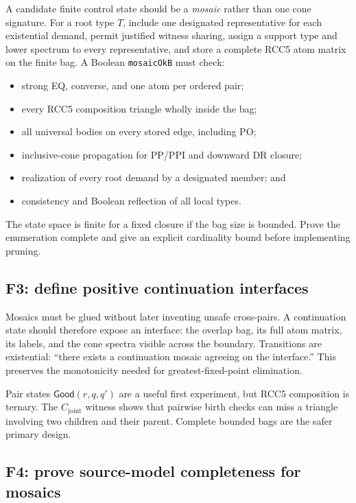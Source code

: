 \documentclass[11pt]{article}
\newcommand{\code}[1]{\texttt{#1}}
\begin{document}
A candidate finite control state should be a \emph{mosaic} rather than one cone
signature. For a root type $T$, include one designated representative for each
existential demand, permit justified witness sharing, assign a support type and lower
spectrum to every representative, and store a complete RCC5 atom matrix on the finite
bag. A Boolean \code{mosaicOkB} must check:
\begin{itemize}
  \item strong EQ, converse, and one atom per ordered pair;
  \item every RCC5 composition triangle wholly inside the bag;
  \item all universal bodies on every stored edge, including PO;
  \item inclusive-cone propagation for PP/PPI and downward DR closure;
  \item realization of every root demand by a designated member; and
  \item consistency and Boolean reflection of all local types.
\end{itemize}
The state space is finite for a fixed closure if the bag size is bounded. Prove the
enumeration complete and give an explicit cardinality bound before implementing
pruning.

\subsection{F3: define positive continuation interfaces}

Mosaics must be glued without later inventing unsafe cross-pairs. A continuation state
should therefore expose an interface: the overlap bag, its full atom matrix, its labels,
and the cone spectra visible across the boundary. Transitions are existential:
``there exists a continuation mosaic agreeing on the interface.'' This preserves the
monotonicity needed for greatest-fixed-point elimination.

Pair states $\mathsf{Good}(r,q,q')$ are a useful first experiment, but RCC5 composition
is ternary. The $C_{\mathrm{joint}}$ witness shows that pairwise birth checks can miss a
triangle involving two children and their parent. Complete bounded bags are the safer
primary design.

\subsection{F4: prove source-model completeness for mosaics}
\end{document}
